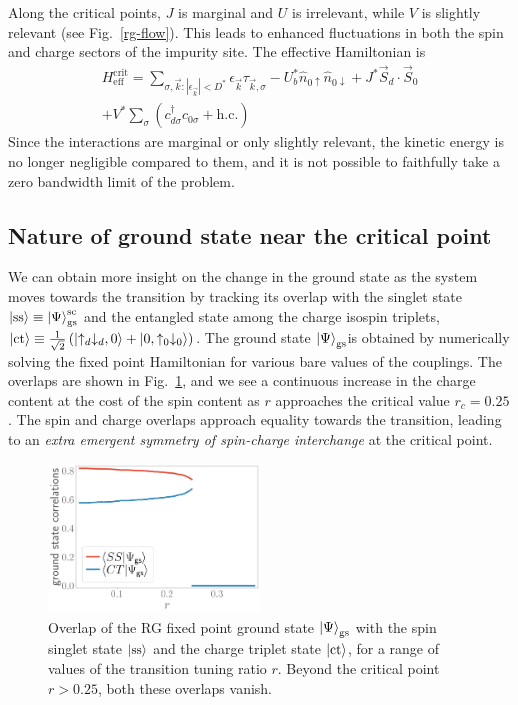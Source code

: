 \documentclass[reprint,superscriptaddress,floatfix]{revtex4-2}
\begin{document}
Along the critical points, \(J\) is marginal and \(U\) is irrelevant, while \(V\) is slightly relevant (see Fig.~\ref{rg-flow}). This leads to enhanced fluctuations in both the spin and charge sectors of the impurity site. The effective Hamiltonian is
\begin{equation}\begin{aligned}
	H_\text{eff}^\text{crit} = \sum_{\sigma,\vec k:|\epsilon_{\vec k}| < D^*} \epsilon_{\vec k} \tau_{\vec k,\sigma} - U_b^* \hat n_{0 \uparrow} \hat n_{0 \downarrow} + J^* \vec{S}_d\cdot\vec{S}_0\\
	+ V^*\sum_\sigma \left( c^\dagger_{d\sigma}c_{0\sigma} + \text{h.c.}\right) 
\end{aligned}\end{equation}
Since the interactions are marginal or only slightly relevant, the kinetic energy is no longer negligible compared to them, and it is not possible to faithfully take a zero bandwidth limit of the problem. 
\subsection{Nature of ground state near the critical point}

We can obtain more insight on the change in the ground state as the system moves towards the transition by tracking its overlap with the singlet state \(\ket{\text{ss}} \equiv \ket{\Psi}_\text{gs}^\text{sc}\) and the entangled state among the charge isospin triplets, \(\ket{\text{ct}} \equiv \frac{1}{\sqrt 2}\left(\ket{\uparrow_d \downarrow_d,0} + \ket{0,\uparrow_0 \downarrow_0}\right)\). The ground state \(\ket{\Psi}_\text{gs}\)is obtained by numerically solving the fixed point Hamiltonian for various bare values of the couplings. The overlaps are shown in Fig.~\ref{overlaps}, and we see a continuous increase in the charge content at the cost of the spin content as \(r\) approaches the critical value \(r_c = 0.25\). The spin and charge overlaps approach equality towards the transition, leading to an {\it extra emergent symmetry of spin-charge interchange} at the critical point.

\begin{figure}[htpb]
	\centering
\includegraphics[width=0.5\textwidth]{corrs_gs.pdf}
\caption{Overlap of the RG fixed point ground state \(\ket{\Psi}_\text{gs}\) with the spin singlet state \(\ket{\text{ss}}\) and the charge triplet state \(\ket{\text{ct}}\), for a range of values of the transition tuning ratio \(r\). Beyond the critical point \(r > 0.25\), both these overlaps vanish.}
	\label{overlaps}
\end{figure}
\end{document}

